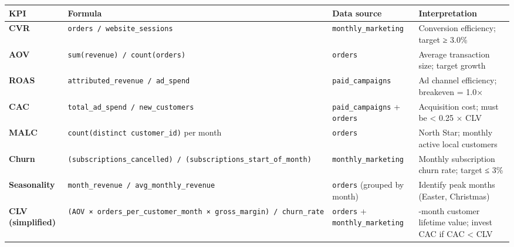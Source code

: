 \documentclass[
  11pt,
]{article}
\begin{document}
\begin{longtable}[]{@{}
  >{\raggedright\arraybackslash}p{}
  >{\raggedright\arraybackslash}p{}
  >{\raggedright\arraybackslash}p{}
  >{\raggedright\arraybackslash}p{}@{}}
\toprule\noalign{}
\begin{minipage}[b]{\linewidth}\raggedright
KPI
\end{minipage} & \begin{minipage}[b]{\linewidth}\raggedright
Formula
\end{minipage} & \begin{minipage}[b]{\linewidth}\raggedright
Data source
\end{minipage} & \begin{minipage}[b]{\linewidth}\raggedright
Interpretation
\end{minipage} \\
\midrule\noalign{}
\endhead
\bottomrule\noalign{}
\endlastfoot
\textbf{CVR} & \texttt{orders\ /\ website\_sessions} &
\texttt{monthly\_marketing} & Conversion efficiency; target ≥ 3.0\% \\
\textbf{AOV} & \texttt{sum(revenue)\ /\ count(orders)} & \texttt{orders}
& Average transaction size; target growth \\
\textbf{ROAS} & \texttt{attributed\_revenue\ /\ ad\_spend} &
\texttt{paid\_campaigns} & Ad channel efficiency; breakeven = 1.0× \\
\textbf{CAC} & \texttt{total\_ad\_spend\ /\ new\_customers} &
\texttt{paid\_campaigns} + \texttt{orders} & Acquisition cost; must be
\textless{} 0.25 × CLV \\
\textbf{MALC} & \texttt{count(distinct\ customer\_id)} per month &
\texttt{orders} & North Star; monthly active local customers \\
\textbf{Churn} &
\texttt{(subscriptions\_cancelled)\ /\ (subscriptions\_start\_of\_month)}
& \texttt{monthly\_marketing} & Monthly subscription churn rate; target
≤ 3\% \\
\textbf{Seasonality} & \texttt{month\_revenue\ /\ avg\_monthly\_revenue}
& \texttt{orders} (grouped by month) & Identify peak months (Easter,
Christmas) \\
\textbf{CLV (simplified)} &
\texttt{(AOV\ ×\ orders\_per\_customer\_month\ ×\ gross\_margin)\ /\ churn\_rate}
& \texttt{orders} + \texttt{monthly\_marketing} & 12-month customer
lifetime value; invest CAC if CAC \textless{} CLV \\
\end{longtable}
\end{document}
